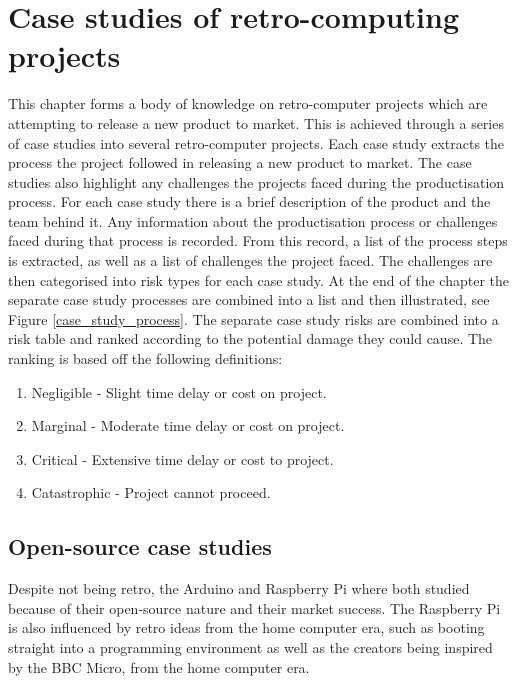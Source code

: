 

\chapter{Case studies of retro-computing projects}
\label{Chapter3}
This chapter forms a body of knowledge on retro-computer projects which are attempting to release a new product to market. This is achieved through a series of case studies into several retro-computer projects. Each case study extracts the process the project followed in releasing a new product to market. The case studies also highlight any challenges the projects faced during the productisation process. For each case study there is a brief description of the product and the team behind it. Any information about the productisation process or challenges faced during that process is recorded. From this record, a list of the process steps is extracted, as well as a list of challenges the project faced. The challenges are then categorised into risk types for each case study. At the end of the chapter the separate case study processes are combined into a list and then illustrated, see Figure \ref{case_study_process}. The separate case study risks are combined into a risk table and ranked according to the potential damage they could cause. The ranking is based off the following definitions:
\begin{enumerate}
\item Negligible 	- Slight time delay or cost on project.
\item Marginal 		- Moderate time delay or cost on project. 
\item Critical 		- Extensive time delay or cost to project.
\item Catastrophic 	- Project cannot proceed.
\end{enumerate}

\section{Open-source case studies}
Despite not being retro, the Arduino and Raspberry Pi where both studied because of their open-source nature and their market success. The Raspberry Pi is also influenced by retro ideas from the home computer era, such as booting straight into a programming environment as well as the creators being inspired by the BBC Micro, from the home computer era.

